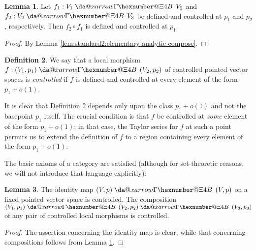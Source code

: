 \documentclass[reqno]{amsart}
\makeatletter
\newcommand*{\da@rightarrow}{\mathchar"0\hexnumber@\symAMSa 4B }
\newcommand*{\xdashrightarrow}[2][]{%
  \mathrel{%
    \mathpalette{\da@xarrow{#1}{#2}{}\da@rightarrow{\,}{}}{}%
  }%
}
\newcommand*{\da@xarrow}[7]{%
  \sbox0{$\ifx#7\scriptstyle\scriptscriptstyle\else\scriptstyle\fi#5#1#6\m@th$}%
  \sbox2{$\ifx#7\scriptstyle\scriptscriptstyle\else\scriptstyle\fi#5#2#6\m@th$}%
  \sbox4{$#7\dabar@\m@th$}%
  \dimen@=\wd0 %
  \ifdim\wd2 >\dimen@
    \dimen@=\wd2 %
  \fi
  \count@=2 %
  \def\da@bars{\dabar@\dabar@}%
  \@whiledim\count@\wd4<\dimen@\do{%
    \advance\count@\@ne
    \expandafter\def\expandafter\da@bars\expandafter{%
      \da@bars
      \dabar@ 
    }%
  }%
  \mathrel{#3}%
  \mathrel{%
    \mathop{\da@bars}\limits
    \ifx\\#1\\%
    \else
      _{\copy0}%
    \fi
    \ifx\\#2\\%
    \else
      ^{\copy2}%
    \fi
  }%
  \mathrel{#4}%
}
\DeclareMathOperator{\dom}{dom}
\def\O{\operatorname{O}}
\theoremstyle{plain} \newtheorem{theorem} {Theorem}
\theoremstyle{definition} \newtheorem{definition} [theorem] {Definition}
\theoremstyle{itplain} %
\newtheorem{lemma}[theorem]{Lemma}
\numberwithin{equation}{section}
\numberwithin{theorem}{section}
\makeatother
\begin{document}
\begin{lemma}\label{lem:standard2:controlled-composition}
  Let $f_1 : V_1 \xdashrightarrow{} V_2$ and $f_2 : V_2 \xdashrightarrow{} V_3$ be defined and controlled at $p_1$ and $p_2$, respectively.  Then $f_2 \circ f_1$ is defined and controlled at $p_1$.
\end{lemma}
\begin{proof}
  By Lemma \ref{lem:standard2:elementary-analytic-compose}.
\end{proof}

\begin{definition}\label{defn:let-v_1-v_2}
We say that a local morphism $f : (V_1, p_1) \xdashrightarrow{} (V_2, p_2)$ of controlled pointed vector spaces is \emph{controlled} if $f$ is defined and controlled at every element of the form $p_1 + o(1)$.
\end{definition}

\begin{remark}
  It is clear that Definition \ref{defn:let-v_1-v_2} depends only upon the class $p_1 + o(1)$ and not the basepoint $p_1$ itself.  The crucial condition is that $f$ be controlled at \emph{some} element of the form $p_1 + o(1)$; in that case, the Taylor series for $f$ at such a point permits us to extend the definition of $f$ to a region containing every element of the form $p_1 + o(1)$.
\end{remark}


The basic axioms of a category are satisfied (although for set-theoretic reasons, we will not introduce that language explicitly):
\begin{lemma}\label{lem:identity-map--m-0}
  The identity map $(V,p) \xdashrightarrow{} (V,p)$ on a fixed pointed vector space is controlled.  The composition $(V_1,p_1) \xdashrightarrow{} (V_2, p_2) \xdashrightarrow{} (V_3, p_3)$ of any pair of controlled local morphisms is controlled.
\end{lemma}
\begin{proof}
  The assertion concerning the identity map is clear, while that concerning compositions follows from Lemma \ref{lem:standard2:controlled-composition}.
\end{proof}
\end{document}

